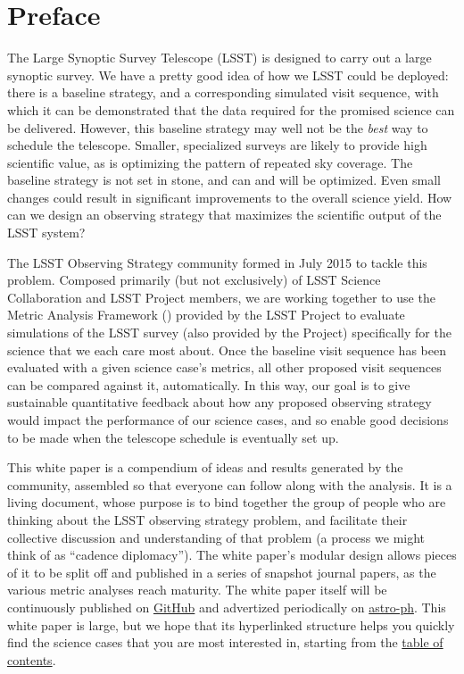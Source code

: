 \setcounter{chapter}{0}
\chapter*{Preface}
\def\chpname{preface}\label{chp:\chpname}
\markboth{}{}

\noindent The Large Synoptic Survey Telescope (LSST) is designed to
carry out a large synoptic survey.  We have a pretty good idea of how we
LSST could be deployed: there is a baseline strategy, and a
corresponding simulated visit sequence, with which it can be
demonstrated that the data required for the promised science can be
delivered. However, this baseline strategy may well not be the {\it
best} way to schedule the telescope. Smaller, specialized surveys are
likely to provide high scientific value, as is optimizing the pattern of
repeated sky coverage.  The baseline strategy is not set in stone, and
can and will be optimized. Even small changes could result in
significant improvements to the overall science yield. How can we design
an observing strategy that maximizes the scientific output of the LSST
system?

\noindent The LSST Observing Strategy community formed in July 2015 to
tackle this problem. Composed primarily (but not exclusively) of  LSST
Science Collaboration and LSST Project members, we are working together
to use the Metric Analysis Framework (\MAF) provided by the LSST Project
to evaluate \OpSim simulations of the LSST survey (also provided by the
Project) specifically for the science that we each care most about. Once
the baseline visit sequence has been evaluated with a given science
case's metrics, all other proposed visit sequences can be compared
against it, automatically. In this way, our goal is to give sustainable
quantitative feedback about how any proposed observing strategy would
impact the performance of our science cases, and so enable good
decisions to be made when the telescope schedule  is eventually set up.

\noindent This white paper is a compendium of ideas and results
generated by the community, assembled so that everyone can follow along
with the analysis. It is a living document, whose purpose is to bind
together the group of people who are thinking about the LSST observing
strategy problem, and facilitate their collective discussion and
understanding of that problem (a process we might think of as  ``cadence
diplomacy''). The white paper's modular design allows pieces of it to be
split off and published in a series of snapshot journal papers, as the
various metric analyses reach maturity. The white paper itself will be
continuously published on
\href{https://github.com/LSSTScienceCollaborations/ObservingStrategy}{GitHub}
and advertized periodically on \href{http://arxiv.org}{astro-ph}. This
white paper is large, but we hope that its hyperlinked structure helps
you quickly find the science cases that you are most interested in,
starting from the \hyperref[toc]{table of contents}.

